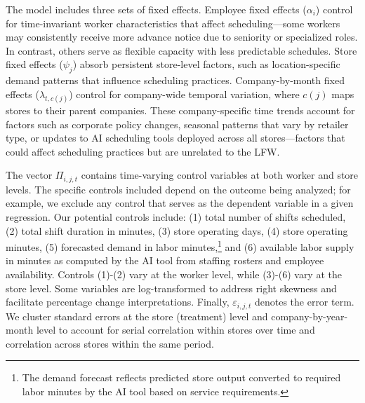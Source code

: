 \documentclass[letterpaper,11pt,leqno]{article}
\theoremstyle{paper}
\begin{document}
The model includes three sets of fixed effects. Employee fixed effects ($\alpha_i$) control for time-invariant worker characteristics that affect scheduling—some workers may consistently receive more advance notice due to seniority or specialized roles. In contrast, others serve as flexible capacity with less predictable schedules. Store fixed effects ($\psi_j$) absorb persistent store-level factors, such as location-specific demand patterns that influence scheduling practices. Company-by-month fixed effects ($\lambda_{t,c(j)}$) control for company-wide temporal variation, where $c(j)$ maps stores to their parent companies. These company-specific time trends account for factors such as corporate policy changes, seasonal patterns that vary by retailer type, or updates to AI scheduling tools deployed across all stores—factors that could affect scheduling practices but are unrelated to the LFW.

The vector $\Pi_{i,j,t}$ contains time-varying control variables at both worker and store levels. The specific controls included depend on the outcome being analyzed; for example, we exclude any control that serves as the dependent variable in a given regression. Our potential controls include: (1) total number of shifts scheduled, (2) total shift duration in minutes, (3) store operating days, (4) store operating minutes, (5) forecasted demand in labor minutes,\footnote{The demand forecast reflects predicted store output converted to required labor minutes by the AI tool based on service requirements.} and (6) available labor supply in minutes as computed by the AI tool from staffing rosters and employee availability. Controls (1)-(2) vary at the worker level, while (3)-(6) vary at the store level. Some variables are log-transformed to address right skewness and facilitate percentage change interpretations. Finally, $\varepsilon_{i,j,t}$ denotes the error term. We cluster standard errors at the store (treatment) level and company-by-year-month level to account for serial correlation within stores over time and correlation across stores within the same period.
\end{document}
